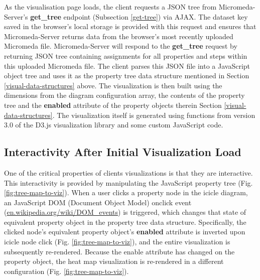 As the visualisation page loads, the client requests a JSON tree from Micromeda-Server's \textbf{get\_tree} endpoint (Subsection \ref{get-tree}) via AJAX. The dataset key saved in the browser's local storage is provided with this request and ensures that Micromeda-Server returns data from the browser's most recently uploaded Micromeda file. Micromeda-Server will respond to the \textbf{get\_tree} request by returning JSON tree containing assignments for all properties and steps within this uploaded Micromeda file. The client parses this JSON file into a JavaScript object tree and uses it as the property tree data structure mentioned in Section \ref{visual-data-structures} above. The visualization is then built using the dimensions from the diagram configuration array, the contents of the property tree and the \textbf{enabled} attribute of the property objects therein Section \ref{visual-data-structures}. The visualization itself is generated using functions from version 3.0 of the D3.js visualization library \cite{bostock2015d3} and some custom JavaScript code.

\subsection{Interactivity After Initial Visualization Load}

One of the critical properties of clients visualizations is that they are interactive. This interactivity is provided by manipulating the JavaScript property tree (Fig. \ref{fig:tree-map-to-viz}). When a user clicks a property node in the icicle diagram, an JavaScript DOM (Document Object Model) onclick event \cite{dom-events} (\href{en.wikipedia.org/wiki/DOM\_events}{en.wikipedia.org/wiki/DOM\_events}) is triggered, which changes that state of equivalent property object in the property tree data structure. Specifically, the clicked node's equivalent property object's \textbf{enabled} attribute is inverted upon icicle node click (Fig. \ref{fig:tree-map-to-viz}), and the entire visualization is subsequently re-rendered. Because the enable attribute has changed on the property object, the heat map visualization is re-rendered in a different configuration (Fig. \ref{fig:tree-map-to-viz}). 


